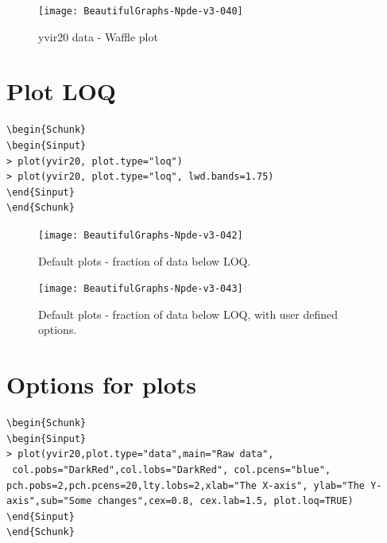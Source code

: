 \documentclass{report}
\begin{document}
\begin{figure}[H]
\caption{yvir20 data - Waffle plot}
\centering
\texttt{[image: BeautifulGraphs-Npde-v3-040]}
\end{figure}

\section{Plot LOQ}

\begin{lstlisting}[linerange=\\begin\{Sinput\}-\\end\{Sinput\}, includerangemarker=false]
\begin{Schunk}
\begin{Sinput}
> plot(yvir20, plot.type="loq")
> plot(yvir20, plot.type="loq", lwd.bands=1.75)
\end{Sinput}
\end{Schunk}
\end{lstlisting}


\begin{figure}[H]
\caption{Default plots - fraction of data below LOQ.}
\centering
\texttt{[image: BeautifulGraphs-Npde-v3-042]}
\end{figure}

\begin{figure}[H]
\caption{Default plots - fraction of data below LOQ, with user defined options.}
\centering
\texttt{[image: BeautifulGraphs-Npde-v3-043]}
\end{figure}

\section{Options for plots}

\begin{lstlisting}[linerange=\\begin\{Sinput\}-\\end\{Sinput\}, includerangemarker=false]
\begin{Schunk}
\begin{Sinput}
> plot(yvir20,plot.type="data",main="Raw data",
 col.pobs="DarkRed",col.lobs="DarkRed", col.pcens="blue", pch.pobs=2,pch.pcens=20,lty.lobs=2,xlab="The X-axis", ylab="The Y-axis",sub="Some changes",cex=0.8, cex.lab=1.5, plot.loq=TRUE)
\end{Sinput}
\end{Schunk}
\end{lstlisting}
\end{document}
